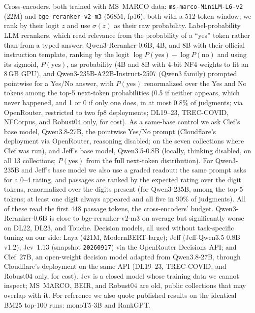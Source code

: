Cross-encoders, both trained with MS~MARCO\cite{bajaj2016msmarco} data: \texttt{ms-marco-MiniLM-L6-v2} (22M) and \texttt{bge-reranker-v2-m3} (568M, fp16)\cite{bgererankerv2m3,chen2024bgem3}, both with a 512-token window; we rank by their logit $z$ and use $\sigma(z)$ as their raw probability.
Label-probability LLM rerankers, which read relevance from the probability of a ``yes'' token rather than from a typed answer: Qwen3-Reranker-0.6B, 4B, and 8B\cite{qwen3embedding} with their official instruction template, ranking by the logit $\log P(\text{yes})-\log P(\text{no})$ and using its sigmoid, $P(\text{yes})$, as probability (4B and 8B with 4-bit NF4 weights\cite{dettmers2023qlora} to fit an 8\,GB GPU), and Qwen3-235B-A22B-Instruct-2507 (Qwen3 family\cite{qwen3}) prompted pointwise for a Yes/No answer, with $P(\text{yes})$ renormalized over the Yes and No tokens among the top-5 next-token probabilities\cite{zhuang2023beyond} (0.5 if neither appears, which never happened, and 1 or 0 if only one does, in at most 0.8\% of judgments; via OpenRouter, restricted to two fp8 deployments; DL19--23, TREC-COVID, NFCorpus, and Robust04 only, for cost).
As a same-base control we ask Clef's base model, Qwen3.8-27B, the pointwise Yes/No prompt (Cloudflare's deployment via OpenRouter, reasoning disabled; on the seven collections where Clef was run), and Jeff\kern0pt's base model, Qwen3.5-0.8B (locally, thinking disabled, on all 13 collections; $P(\text{yes})$ from the full next-token distribution).
For Qwen3-235B and Jeff's base model we also use a graded readout\cite{zhuang2023beyond}: the same prompt asks for a 0--4 rating, and passages are ranked by the expected rating over the digit tokens, renormalized over the digits present (for Qwen3-235B, among the top-5 tokens; at least one digit always appeared and all five in 90\% of judgments). All of these read the first 448 passage tokens, the cross-encoders' budget. Qwen3-Reranker-0.6B is close to bge-reranker-v2-m3 on average but significantly worse on DL22, DL23, and Touche.
Decision models, all used without task-specific tuning on our side: Laya (421M, ModernBERT-large\cite{warner2024modernbert})\cite{laya}; Jeff\cite{jeff} (Jeff-Qwen3.5-0.8B v1.2); Jev~1.13 (snapshot \texttt{20260917}) via the OpenRouter Decisions API\cite{jev}; and Clef~27B\cite{clef}, an open-weight decision model adapted from Qwen3.8-27B, through Cloudflare's deployment on the same API (DL19--23, TREC-COVID, and Robust04 only, for cost).
Jev is a closed model whose training data we cannot inspect; MS~MARCO, BEIR, and Robust04 are old, public collections that may overlap with it.
For reference we also quote published results on the identical BM25 top-100 runs: monoT5-3B\cite{nogueira2020monot5} and RankGPT\cite{sun2023rankgpt}.

